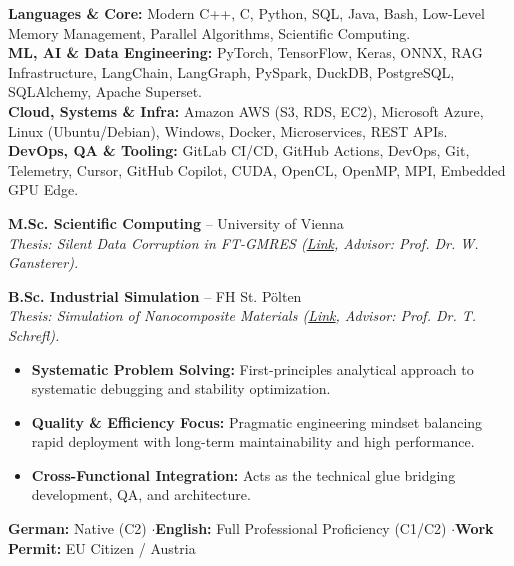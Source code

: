\documentclass[10pt,a4paper]{article}
\begin{document}
\textbf{Languages \& Core:} Modern C++, C, Python, SQL, Java, Bash, Low-Level Memory Management, Parallel Algorithms, Scientific Computing.\\[0.05em]
\textbf{ML, AI \& Data Engineering:} PyTorch, TensorFlow, Keras, ONNX, RAG Infrastructure, LangChain, LangGraph, PySpark, DuckDB, PostgreSQL, SQLAlchemy, Apache Superset.\\[0.05em]
\textbf{Cloud, Systems \& Infra:} Amazon AWS (S3, RDS, EC2), Microsoft Azure, Linux (Ubuntu/Debian), Windows, Docker, Microservices, REST APIs.\\[0.05em]
\textbf{DevOps, QA \& Tooling:} GitLab CI/CD, GitHub Actions, DevOps, Git, Telemetry, Cursor, GitHub Copilot, CUDA, OpenCL, OpenMP, MPI, Embedded GPU Edge.


\textbf{M.Sc. Scientific Computing} -- University of Vienna \\
\textit{Thesis: Silent Data Corruption in FT-GMRES (\href{https://utheses.univie.ac.at/detail/40917/}{Link}, Advisor: Prof. Dr. W. Gansterer).}

\vspace{0.1cm}
\textbf{B.Sc. Industrial Simulation} -- FH St. Pölten \\
\textit{Thesis: Simulation of Nanocomposite Materials (\href{\meinGithub/thesis/blob/master/Bakkarbeit_final.pdf}{Link}, Advisor: Prof. Dr. T. Schrefl).}


\begin{itemize}
    \item \textbf{Systematic Problem Solving:} First-principles analytical approach to systematic debugging and stability optimization.
    \item \textbf{Quality & Efficiency Focus:} Pragmatic engineering mindset balancing rapid deployment with long-term maintainability and high performance.
    \item \textbf{Cross-Functional Integration:} Acts as the technical glue bridging development, QA, and architecture.
\end{itemize}


\textbf{German:} Native (C2) \quad$\cdot$\quad \textbf{English:} Full Professional Proficiency (C1/C2) \quad$\cdot$\quad \textbf{Work Permit:} EU Citizen / Austria
\end{document}
